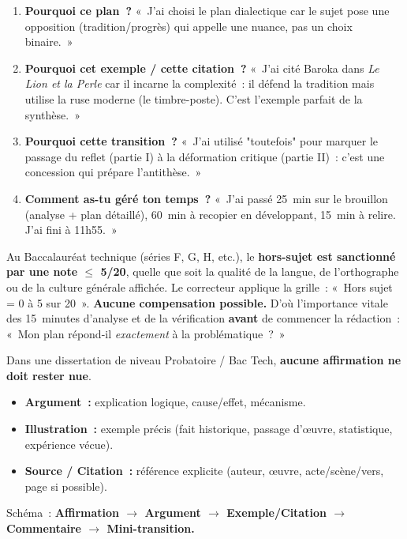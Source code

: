 \documentclass[11pt]{article}
\begin{document}
\begin{methode}
\begin{enumerate}
    \item \textbf{Pourquoi ce plan~?} «~J'ai choisi le plan dialectique car le sujet pose une opposition (tradition/progrès) qui appelle une nuance, pas un choix binaire.~»
    \item \textbf{Pourquoi cet exemple / cette citation~?} «~J'ai cité Baroka dans \emph{Le Lion et la Perle} car il incarne la complexité~: il défend la tradition mais utilise la ruse moderne (le timbre-poste). C'est l'exemple parfait de la synthèse.~»
    \item \textbf{Pourquoi cette transition~?} «~J'ai utilisé "toutefois" pour marquer le passage du reflet (partie I) à la déformation critique (partie II)~: c'est une concession qui prépare l'antithèse.~»
    \item \textbf{Comment as-tu géré ton temps~?} «~J'ai passé 25~min sur le brouillon (analyse + plan détaillé), 60~min à recopier en développant, 15~min à relire. J'ai fini à 11h55.~»
\end{enumerate}
\end{methode}

\begin{savaistu}
Au Baccalauréat technique (séries F, G, H, etc.), le \textbf{hors-sujet est sanctionné par une note $\le$ 5/20}, quelle que soit la qualité de la langue, de l'orthographe ou de la culture générale affichée. Le correcteur applique la grille~: «~Hors sujet = 0 à 5 sur 20~». \textbf{Aucune compensation possible.} D'où l'importance vitale des 15~minutes d'analyse et de la vérification \textbf{avant} de commencer la rédaction~: «~Mon plan répond-il \emph{exactement} à la problématique~?~»
\end{savaistu}

\begin{propriete}
Dans une dissertation de niveau Probatoire / Bac Tech, \textbf{aucune affirmation ne doit rester nue}.
\begin{itemize}
    \item \textbf{Argument~:} explication logique, cause/effet, mécanisme.
    \item \textbf{Illustration~:} exemple précis (fait historique, passage d'œuvre, statistique, expérience vécue).
    \item \textbf{Source / Citation~:} référence explicite (auteur, œuvre, acte/scène/vers, page si possible).
\end{itemize}
Schéma~: \textbf{Affirmation $\rightarrow$ Argument $\rightarrow$ Exemple/Citation $\rightarrow$ Commentaire $\rightarrow$ Mini-transition.}
\end{propriete}
\end{document}
